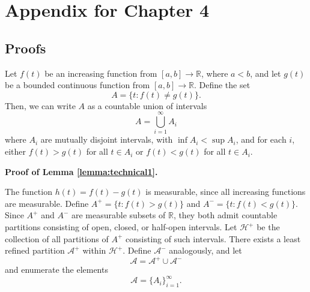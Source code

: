 
\chapter{Appendix for Chapter 4} %

\label{AppendixD} %

\section{Proofs}


\begin{lemma}\label{lemma:technical1}
Let $f(t)$ be an increasing function from $[a, b] \to \mathbb{R}$, where $a < b$,
and let $g(t)$ be a bounded continuous function from $[a, b] \to \mathbb{R}$.
Define the set
\[
A = \{t: f(t) \neq g(t)\}.
\]
Then, we can write $A$ as a countable union of intervals
\[
A = \bigcup_{i=1}^\infty A_i
\]
where $A_i$ are mutually disjoint intervals, with $\inf A_i < \sup
A_i$, and for each $i$, either $f(t) > g(t)$ for all $t \in A_i$ or
$f(t) < g(t)$ for all $t \in A_i$.
\end{lemma}

\textbf{Proof of Lemma \ref{lemma:technical1}.} 

The function $h(t) = f(t) - g(t)$ is measurable, since all increasing
functions are measurable.  Define $A^+ = \{t: f(t) > g(t)\}$ and $A^-
= \{t: f(t) < g(t)\}$.  Since $A^+$ and $A^-$ are measurable subsets
of $\mathbb{R}$, they both admit countable partitions consisting of open, closed, or half-open
intervals.  Let $\mathcal{H}^+$ be the collection of all partitions of $A^+$ consisting of such intervals.
There exists a least refined partition $\mathcal{A}^+$ within $\mathcal{H}^+$.
Define $\mathcal{A}^-$ analogously, and let
\[
\mathcal{A} = \mathcal{A}^+ \cup \mathcal{A}^-
\]
and enumerate the elements
\[
\mathcal{A} = \{A_i\}_{i=1}^\infty.
\]

